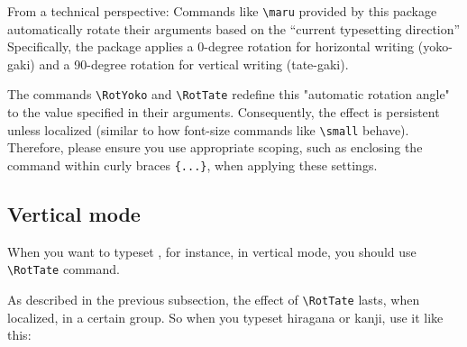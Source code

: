 \documentclass[luatex,fontsize=8pt,paper=b5,twoside]{jlreq}%
\begin{document}
From a technical perspective: Commands like \verb|\maru| provided by this package automatically rotate their arguments based on the ``current typesetting direction'' Specifically, the package applies a 0-degree rotation for horizontal writing (yoko-gaki) and a 90-degree rotation for vertical writing (tate-gaki).

The commands \verb|\RotYoko| and \verb|\RotTate| redefine this "automatic rotation angle" to the value specified in their arguments. Consequently, the effect is persistent unless localized (similar to how font-size commands like \verb|\small| behave). Therefore, please ensure you use appropriate scoping, such as enclosing the command within curly braces \verb|{...}|, when applying these settings.



\subsection{Vertical mode}
When you want to typeset , for instance, in vertical mode, you should use \verb|\RotTate| command. 

As described in the previous subsection, the effect of \verb|\RotTate| lasts, when localized, in a certain group. So when you typeset hiragana or kanji, use it like this:

\end{document}
